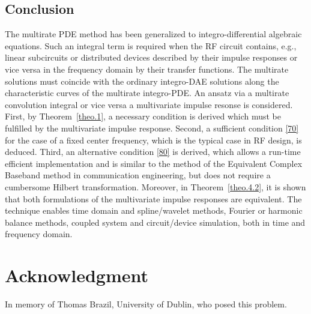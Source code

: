 \documentclass[journal]{IEEEtran}
\begin{document}
\subsection*{Conclusion}

The multirate PDE method has been generalized to integro-differential algebraic equations. 
Such
an integral term is required when the RF circuit contains, e.g.,
linear subcircuits or distributed devices described by their impulse responses
or vice versa in the frequency domain by their transfer functions.
The multirate solutions must coincide with the ordinary integro-DAE 
solutions
along the characteristic curves of the multirate integro-PDE. 
An ansatz via a multirate convolution integral or vice versa
a multivariate impulse resonse is considered.
First, by Theorem~\ref{theo.1}, a necessary condition is derived which must be fulfilled
by the multivariate impulse response. Second, a sufficient condition \eqref{70}
for the case of a fixed center frequency, which is the typical case in RF design, is deduced.
Third,
an alternative condition \eqref{80} is derived, which allows a run-time
efficient implementation and is similar to
the method of the Equivalent Complex Baseband method
in communication engineering, but does
not require a cumbersome Hilbert transformation. Moreover, in Theorem~\ref{theo.4.2},
it is shown that both formulations of the multivariate impulse responses are equivalent.
The technique enables time domain and spline/wavelet methods, 
Fourier or harmonic balance methods, coupled system and 
circuit/device simulation,
both in time and frequency domain.

\enlargethispage{\baselineskip}

\section{Acknowledgment}
In memory of Thomas Brazil, University of Dublin,
who posed this problem.




\end{document}
